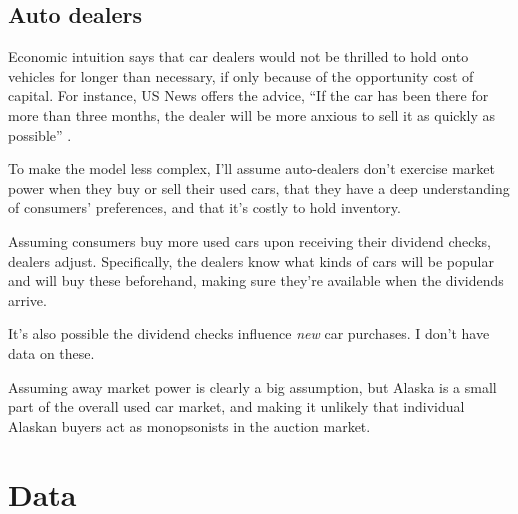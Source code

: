 \documentclass[11pt,letterpaper,oneside]{article}
\begin{document}
\begin{doublespacing}
\subsection{Auto dealers}

Economic intuition says that car dealers would not be thrilled to hold onto vehicles for longer than necessary, if only because of the opportunity cost of capital.
For instance, US News offers the advice, ``If the car has been there for more than three months, the dealer will be more anxious to sell it as quickly as possible''
\parencite{usnews_car_deals}.

To make the model less complex, I'll assume auto-dealers don't exercise market power when they buy or sell their used cars, that they have a deep understanding of consumers' preferences, and that it's costly to hold inventory.

Assuming consumers buy more used cars upon receiving their dividend checks, dealers adjust.
Specifically, the dealers know what kinds of cars will be popular and will buy these beforehand, making sure they're available when the dividends arrive.

It's also possible the dividend checks influence \emph{new} car purchases.
I don't have data on these.

Assuming away market power is clearly a big assumption, but Alaska is a small part of the overall used car market, and making it unlikely that individual Alaskan buyers act as monopsonists in the auction market.




\section{Data}


\end{doublespacing}
\end{document}
